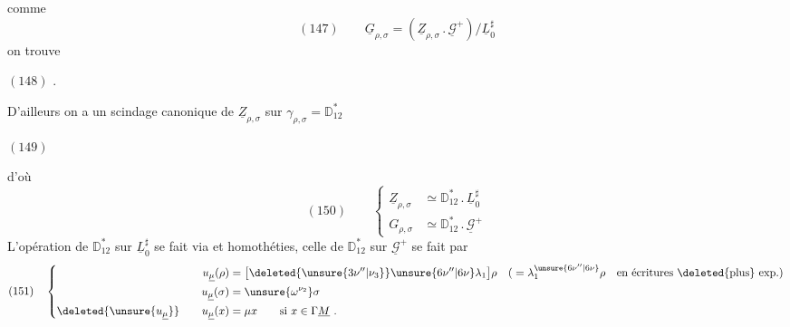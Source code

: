 
comme
\[
(147)\qquad\underline G_{\rho,\sigma}
=(\underline Z_{\rho,\sigma}\mathbin{.}\underline{\mathcal G}^{+})/\underline L_0^{\sharp}
\]
on trouve

\((148)\)
.

D'ailleurs on a un scindage canonique
de \(\underline Z_{\rho,\sigma}\) sur \(\gamma_{\rho,\sigma}=\mathbb D_{12}^{*}\)

\((149)\)


d'où
\[
(150)\qquad
\left\{\begin{aligned}
\underline Z_{\rho,\sigma}&\simeq\mathbb D_{12}^{*}\mathbin{.}\underline L_0^{\sharp}\\
G_{\rho,\sigma}&\simeq\mathbb D_{12}^{*}\mathbin{.}\underline{\mathcal G}^{+}
\end{aligned}\right.
\]
L'opération de \(\mathbb D_{12}^{*}\) sur \(\underline L_0^{\sharp}\) se fait
via
et homothéties, celle
de \(\mathbb D_{12}^{*}\) sur \(\underline{\mathcal G}^{+}\) se fait par
\[
(151)\quad
\left\{\begin{aligned}
u_{\underline\mu}(\rho)&=\bigl[\deleted{\unsure{3\nu''|\nu_3}}\unsure{6\nu''|6\nu}\lambda_1\bigr]\rho
\quad\text{(}=\lambda_1^{\unsure{6\nu''|6\nu}}\rho\quad\text{en écritures \deleted{plus} exp.}\text{)}\\
u_{\underline\mu}(\sigma)&=\unsure{\omega^{\nu_2}}\sigma\\
\deleted{\unsure{u_{\underline\mu}}}\qquad u_{\underline\mu}(x)&=\mu x\qquad\text{si }x\in\Gamma\underline M\ .
\end{aligned}\right.
\]
